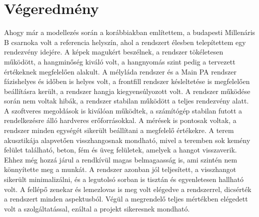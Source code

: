 \section{Végeredmény} %
Ahogy már a modellezés során a korábbiakban említettem, a budapesti Millenáris B csarnoka 
volt a referencia helyszín, ahol a rendszert élesben telepítettem egy rendezvény idejére.
A képek magukért beszélnek, a rendszer tökéletesen működött, a hangminőség kiváló volt, a hangnyomás szint pedig
a tervezett értékeknek megfelelően alakult. A mélyláda rendszer és a Main PA rendszer fázishelyes és időben is helyes
volt, a frontfill rendszer késleltetése is megfelelően beállításra került, a rendszer hangja kiegyensúlyozott volt.
A rendszer működése során nem voltak hibák, a rendszer stabilan működött
a teljes rendezvény alatt. A szoftveres megoldások is kiválóan működtek, a számítógép stabilan futott a
rendelkezésre álló hardveres erőforrásokkal. A mérések is pontosak voltak, a rendszer minden egységét
sikerült beállítani a megfelelő értékekre. 
A terem akusztikája alapvetően visszhangosnak mondható, mivel a teremben sok kemény felület található,
beton, fém és üveg felületek, amelyek a hangot visszaverik. Ehhez még hozzá járul a rendkívül magas belmagaasság is,
ami szintén nem könnyítette meg a munkát. A rendszer azonban jól teljesített, a visszhangot sikerült minimalizálni,
és a legutolsó sorban is tisztán és egyenletesen hallható volt.
A fellépő zenekar és lemezlovas is meg volt elégedve a rendszerrel, dicsérték a rendszert minden aspektusból.
Végül a megrendelő teljes mértékben elégedett volt a szolgáltatással, ezáltal 
a projekt sikeresnek mondható.
